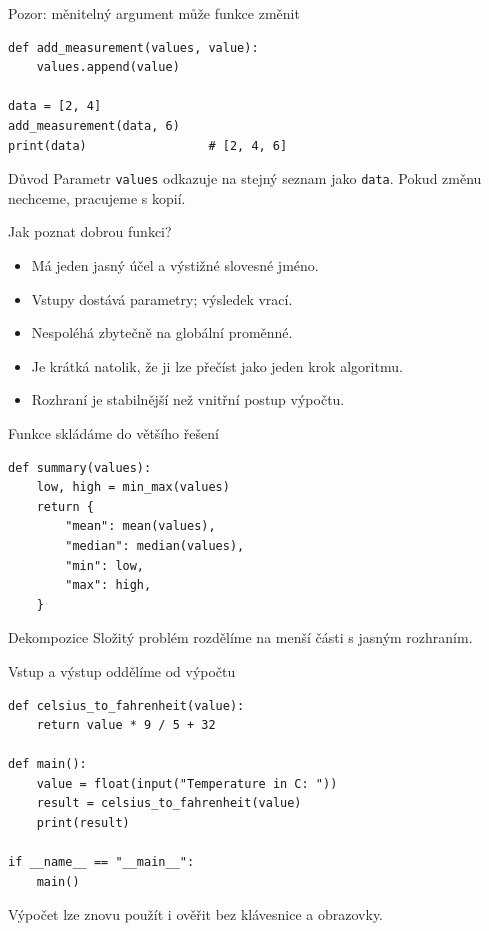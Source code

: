 \documentclass[aspectratio=169]{beamer}
\begin{document}
\begin{frame}[fragile]{Pozor: měnitelný argument může funkce změnit}
\begin{lstlisting}[style=python]
def add_measurement(values, value):
    values.append(value)

data = [2, 4]
add_measurement(data, 6)
print(data)                 # [2, 4, 6]
\end{lstlisting}
  \begin{alertblock}{Důvod}
    Parametr \texttt{values} odkazuje na stejný seznam jako \texttt{data}. Pokud změnu nechceme, pracujeme s kopií.
  \end{alertblock}
\end{frame}

\begin{frame}{Jak poznat dobrou funkci?}
  \begin{itemize}
    \item Má jeden jasný účel a výstižné slovesné jméno.
    \item Vstupy dostává parametry; výsledek vrací.
    \item Nespoléhá zbytečně na globální proměnné.
    \item Je krátká natolik, že ji lze přečíst jako jeden krok algoritmu.
    \item Rozhraní je stabilnější než vnitřní postup výpočtu.
  \end{itemize}
\end{frame}

\begin{frame}[fragile]{Funkce skládáme do většího řešení}
\begin{lstlisting}[style=python,basicstyle=\ttfamily\small]
def summary(values):
    low, high = min_max(values)
    return {
        "mean": mean(values),
        "median": median(values),
        "min": low,
        "max": high,
    }
\end{lstlisting}
  \begin{block}{Dekompozice}
    Složitý problém rozdělíme na menší části s jasným rozhraním.
  \end{block}
\end{frame}

\begin{frame}[fragile]{Vstup a výstup oddělíme od výpočtu}
\begin{lstlisting}[style=python,basicstyle=\ttfamily\normalsize]
def celsius_to_fahrenheit(value):
    return value * 9 / 5 + 32

def main():
    value = float(input("Temperature in C: "))
    result = celsius_to_fahrenheit(value)
    print(result)

if __name__ == "__main__":
    main()
\end{lstlisting}
  Výpočet lze znovu použít i ověřit bez klávesnice a obrazovky.
\end{frame}
\end{document}
